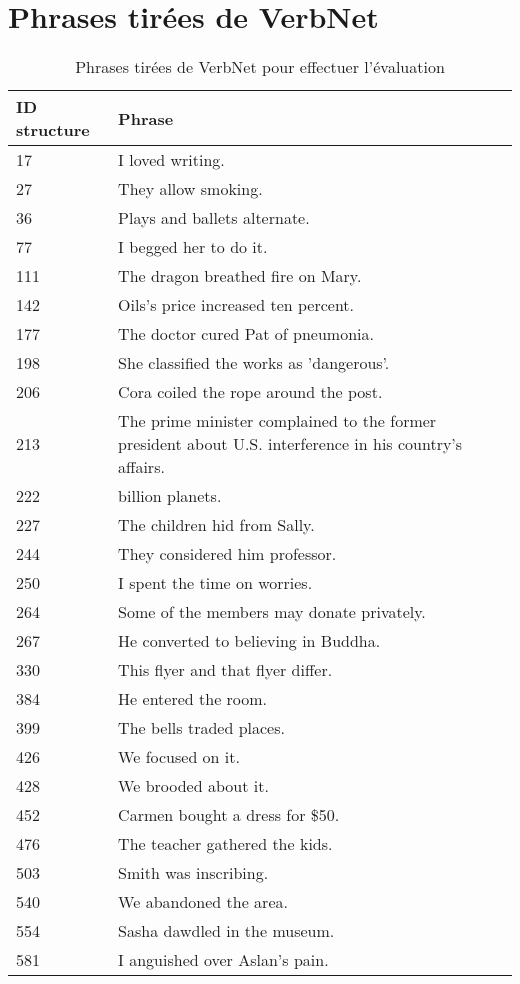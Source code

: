 \chapter{Phrases tirées de VerbNet}
\begin{table}
\caption{Phrases tirées de VerbNet pour effectuer l'évaluation}
\begin{tabular}{llr}
 \toprule
 ID structure & Phrase\\
 \midrule
 17	&	I loved writing.	\\
27	&	They allow smoking.	\\
36	&	Plays and ballets alternate.	\\
77	&	I begged her to do it.	\\
111	&	The dragon breathed fire on Mary.	\\
142	&	Oils's price increased ten percent.	\\
177	&	The doctor cured Pat of pneumonia.	\\
198	&	She classified the works as 'dangerous'.	\\
206	&	Cora coiled the rope around the post.	\\
213	&	The prime minister complained to the former president about U.S. interference in his country's affairs.	\\
222	&	billion planets.	\\
227	&	The children hid from Sally.	\\
244	&	They considered him professor.	\\
250	&	I spent the time on worries.	\\
264	&	Some of the members may donate privately.	\\
267	&	He converted to believing in Buddha.	\\
330	&	This flyer and that flyer differ.	\\
384	&	He entered the room.	\\
399	&	The bells traded places.	\\
426	&	We focused on it.	\\
428	&	We brooded about it.	\\
452	&	Carmen bought a dress for \$50.	\\
476	&	The teacher gathered the kids.	\\
503	&	Smith was inscribing.	\\
540	&	We abandoned the area.	\\
554	&	Sasha dawdled in the museum.	\\
581	&	I anguished over Aslan's pain.	\\

\end{tabular}
\end{table}
